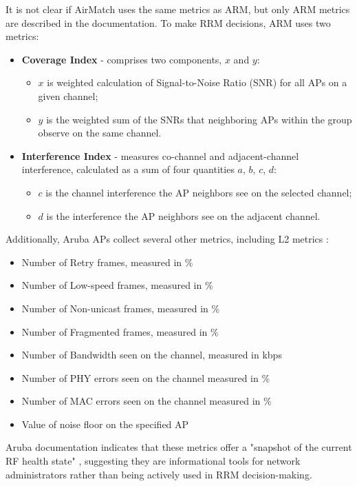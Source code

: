 It is not clear if AirMatch uses the same metrics as ARM, but only ARM metrics are described in the documentation.
To make RRM decisions, ARM uses two metrics:
\begin{itemize}
    \item \textbf{Coverage Index} - comprises two components, $x$ and $y$:
    \begin{itemize}
        \item $x$ is weighted calculation of Signal-to-Noise Ratio (SNR) for all APs on a given channel;
        \item $y$ is the weighted sum of the SNRs that neighboring APs within the group observe on the same channel.
    \end{itemize}
    \item \textbf{Interference Index} - measures co-channel and adjacent-channel interference, calculated as a sum of four quantities $a$, $b$, $c$, $d$:
    \begin{itemize}
        \item $c$ is the channel interference the AP neighbors see on the selected channel;
        \item $d$ is the interference the AP neighbors see on the adjacent channel.
    \end{itemize}
\end{itemize}
Additionally, Aruba APs collect several other metrics, including L2 metrics \cite{ArubaOSUserGuide}:

\begin{itemize}
    \item Number of Retry frames, measured in \%
    \item Number of Low-speed frames, measured in \%
    \item Number of Non-unicast frames, measured in \%
    \item Number of Fragmented frames, measured in \%
    \item Number of Bandwidth seen on the channel, measured in kbps
    \item Number of PHY errors seen on the channel measured in \%
    \item Number of MAC errors seen on the channel measured in \%
    \item Value of noise floor on the specified AP
\end{itemize}

Aruba documentation indicates that these metrics offer a "snapshot of the current RF health state" \cite{ARMMetrics}, suggesting they are informational tools for network administrators rather than being actively used in RRM decision-making.

